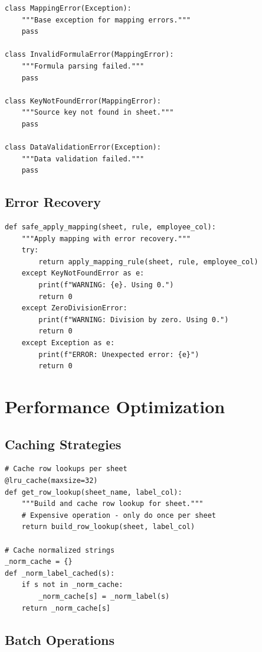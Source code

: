 \begin{lstlisting}[style=pythonstyle]
class MappingError(Exception):
    """Base exception for mapping errors."""
    pass

class InvalidFormulaError(MappingError):
    """Formula parsing failed."""
    pass

class KeyNotFoundError(MappingError):
    """Source key not found in sheet."""
    pass

class DataValidationError(Exception):
    """Data validation failed."""
    pass
\end{lstlisting}

\subsection{Error Recovery}

\begin{lstlisting}[style=pythonstyle]
def safe_apply_mapping(sheet, rule, employee_col):
    """Apply mapping with error recovery."""
    try:
        return apply_mapping_rule(sheet, rule, employee_col)
    except KeyNotFoundError as e:
        print(f"WARNING: {e}. Using 0.")
        return 0
    except ZeroDivisionError:
        print(f"WARNING: Division by zero. Using 0.")
        return 0
    except Exception as e:
        print(f"ERROR: Unexpected error: {e}")
        return 0
\end{lstlisting}

\section{Performance Optimization}

\subsection{Caching Strategies}

\begin{lstlisting}[style=pythonstyle]
# Cache row lookups per sheet
@lru_cache(maxsize=32)
def get_row_lookup(sheet_name, label_col):
    """Build and cache row lookup for sheet."""
    # Expensive operation - only do once per sheet
    return build_row_lookup(sheet, label_col)

# Cache normalized strings
_norm_cache = {}
def _norm_label_cached(s):
    if s not in _norm_cache:
        _norm_cache[s] = _norm_label(s)
    return _norm_cache[s]
\end{lstlisting}

\subsection{Batch Operations}

